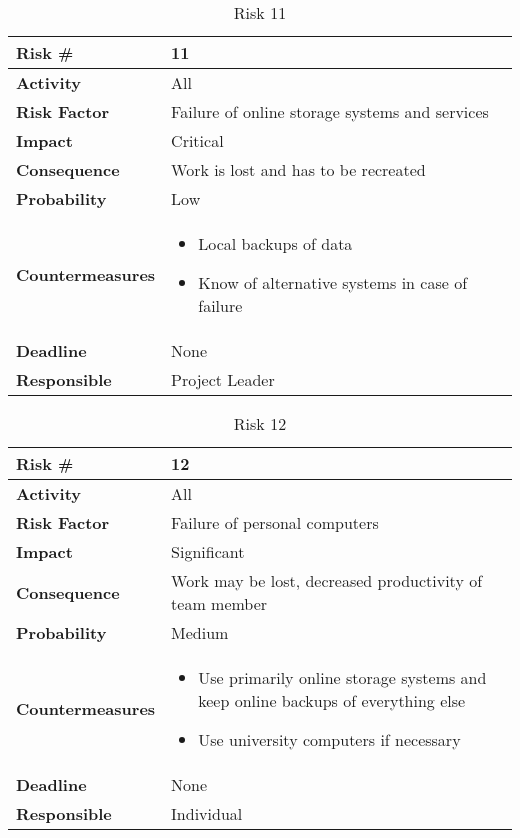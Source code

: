 \medskip

\begin{table}
\begin{tabularx}{\textwidth}{ | l | X | }
\hline
\textbf{Risk \#} & 11 \\ \hline
\textbf{Activity} & All \\ \hline
\textbf{Risk Factor} & Failure of online storage systems and services \\ \hline
\textbf{Impact} & Critical \\ \hline
\textbf{Consequence} & Work is lost and has to be recreated \\ \hline
\textbf{Probability} & Low \\ \hline
\textbf{Countermeasures} & \begin{itemize}
  \item Local backups of data
  \item Know of alternative systems in case of failure
\end{itemize}  \\ \hline
\textbf{Deadline} &  None \\ \hline
\textbf{Responsible} & Project Leader \\ \hline
\end{tabularx}
\caption{Risk 11}
\end{table}

\medskip

\begin{table}
\begin{tabularx}{\textwidth}{ | l | X | }
\hline
\textbf{Risk \#} & 12 \\ \hline
\textbf{Activity} & All \\ \hline
\textbf{Risk Factor} & Failure of personal computers \\ \hline
\textbf{Impact} & Significant \\ \hline
\textbf{Consequence} & Work may be lost, decreased productivity of team member \\ \hline
\textbf{Probability} & Medium \\ \hline
\textbf{Countermeasures} & \begin{itemize}
  \item Use primarily online storage systems and keep online backups of everything else
  \item Use university computers if necessary
\end{itemize}  \\ \hline
\textbf{Deadline} &  None \\ \hline
\textbf{Responsible} & Individual \\ \hline
\end{tabularx}
\caption{Risk 12}
\end{table}

